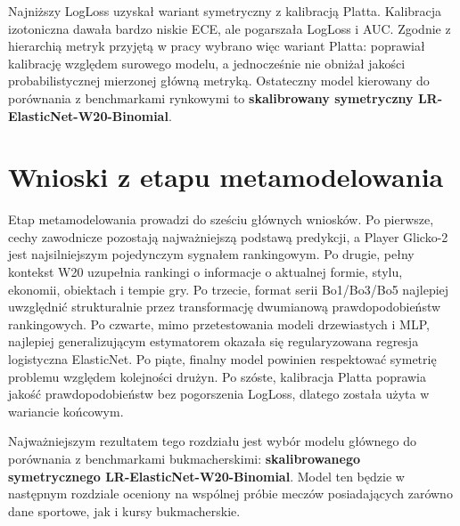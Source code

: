 Najniższy LogLoss uzyskał wariant symetryczny z kalibracją Platta. Kalibracja izotoniczna dawała bardzo niskie ECE, ale pogarszała LogLoss i AUC. Zgodnie z hierarchią metryk przyjętą w pracy wybrano więc wariant Platta: poprawiał kalibrację względem surowego modelu, a jednocześnie nie obniżał jakości probabilistycznej mierzonej główną metryką. Ostateczny model kierowany do porównania z benchmarkami rynkowymi to \textbf{skalibrowany symetryczny LR-ElasticNet-W20-Binomial}.

\section{Wnioski z etapu metamodelowania}

Etap metamodelowania prowadzi do sześciu głównych wniosków. Po pierwsze, cechy zawodnicze pozostają najważniejszą podstawą predykcji, a Player Glicko-2 jest najsilniejszym pojedynczym sygnałem rankingowym. Po drugie, pełny kontekst W20 uzupełnia rankingi o informacje o aktualnej formie, stylu, ekonomii, obiektach i tempie gry. Po trzecie, format serii Bo1/Bo3/Bo5 najlepiej uwzględnić strukturalnie przez transformację dwumianową prawdopodobieństw rankingowych. Po czwarte, mimo przetestowania modeli drzewiastych i MLP, najlepiej generalizującym estymatorem okazała się regularyzowana regresja logistyczna ElasticNet. Po piąte, finalny model powinien respektować symetrię problemu względem kolejności drużyn. Po szóste, kalibracja Platta poprawia jakość prawdopodobieństw bez pogorszenia LogLoss, dlatego została użyta w wariancie końcowym.

Najważniejszym rezultatem tego rozdziału jest wybór modelu głównego do porównania z benchmarkami bukmacherskimi: \textbf{skalibrowanego symetrycznego LR-ElasticNet-W20-Binomial}. Model ten będzie w następnym rozdziale oceniony na wspólnej próbie meczów posiadających zarówno dane sportowe, jak i kursy bukmacherskie.
